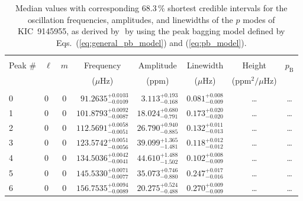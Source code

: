 \begin{table*}[!]
\caption{Median values with corresponding 68.3\,\% shortest credible intervals for the oscillation frequencies, amplitudes, and linewidths of the $p$ modes of KIC~9145955, as derived by \diamonds\,\,by using the peak bagging model defined by Eqs.~(\ref{eq:general_pb_model}) and (\ref{eq:pb_model}).}
\label{tab:9145955p}
\centering
\begin{tabular}{llcrrlrc}
\hline\hline
\\[-8pt]          
Peak \# & $\ell$ & $m$ & \multicolumn{1}{c}{Frequency} & \multicolumn{1}{c}{Amplitude} & \multicolumn{1}{c}{Linewidth} & \multicolumn{1}{c}{Height}& $p_\mathrm{B}$\\
 & & & \multicolumn{1}{c}{($\mu$Hz)} & \multicolumn{1}{c}{(ppm)} & \multicolumn{1}{c}{($\mu$Hz)} & \multicolumn{1}{c}{(ppm$^2/\mu$Hz)}\\
\hline \\[-8pt]
0 & 0 & 0 & $     91.2635_{-      0.0109}^{+      0.0103}$ & $       3.113_{-       0.168}^{+       0.193}$ & $       0.081_{-       0.009}^{+       0.008}$ & \multicolumn{1}{c}{\dots} & \dots \\[1pt]
1 & 0 & 0 & $    101.8793_{-      0.0087}^{+      0.0092}$ & $      18.024_{-       0.791}^{+       0.680}$ & $       0.173_{-       0.020}^{+       0.020}$ & \multicolumn{1}{c}{\dots} & \dots \\[1pt]
2 & 0 & 0 & $    112.5691_{-      0.0051}^{+      0.0058}$ & $      26.790_{-       0.885}^{+       0.940}$ & $       0.132_{-       0.013}^{+       0.011}$ & \multicolumn{1}{c}{\dots} & \dots \\[1pt]
3 & 0 & 0 & $    123.5742_{-      0.0056}^{+      0.0051}$ & $      39.099_{-       1.481}^{+       1.365}$ & $       0.118_{-       0.012}^{+       0.012}$ & \multicolumn{1}{c}{\dots} & \dots \\[1pt]
4 & 0 & 0 & $    134.5036_{-      0.0041}^{+      0.0042}$ & $      44.610_{-       1.502}^{+       1.488}$ & $       0.102_{-       0.009}^{+       0.008}$ & \multicolumn{1}{c}{\dots} & \dots \\[1pt]
5 & 0 & 0 & $    145.5330_{-      0.0077}^{+      0.0071}$ & $      35.073_{-       0.880}^{+       0.746}$ & $       0.247_{-       0.016}^{+       0.017}$ & \multicolumn{1}{c}{\dots} & \dots \\[1pt]
6 & 0 & 0 & $    156.7535_{-      0.0089}^{+      0.0094}$ & $      20.275_{-       0.488}^{+       0.524}$ & $       0.270_{-       0.009}^{+       0.009}$ & \multicolumn{1}{c}{\dots} & \dots \\[1pt]

\end{tabular}
\end{table*}
